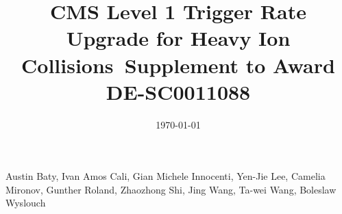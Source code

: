 \begin{titlepage}
\vspace{-.2 cm} 
\date{\today}
\vspace{2 cm}
\title{CMS Level 1 Trigger Rate Upgrade for Heavy Ion Collisions\ Supplement to Award DE-SC0011088 }

\vspace{.2 cm} 
\begin{Authlist}
Austin Baty\footnotemark[1], 
Ivan Amos Cali\footnotemark[1],
Gian Michele Innocenti\footnotemark[1], 
Yen-Jie Lee\footnotemark[1], 
Camelia Mironov\footnotemark[1], 
Gunther Roland\footnotemark[1], 
Zhaozhong Shi\footnotemark[1], 
Jing Wang\footnotemark[1], 
Ta-wei Wang\footnotemark[1], 
Boleslaw Wyslouch\footnotemark[1]
\end{Authlist}



\end{titlepage}





